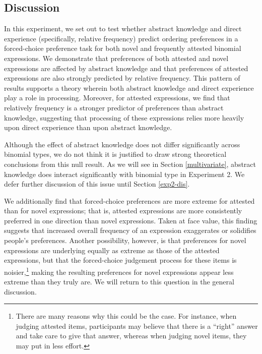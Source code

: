 \documentclass[authoryear]{elsarticle}
\begin{document}
\subsection{Discussion}\label{fc-discuss}
In this experiment, we set out to test whether abstract knowledge and direct experience (specifically, relative frequency) predict ordering preferences in a forced-choice preference task for both novel and frequently attested binomial expressions. We demonstrate that preferences of both attested and novel expressions are affected by abstract knowledge and that preferences of attested expressions are also strongly predicted by relative frequency. This pattern of results supports a theory wherein both abstract knowledge and direct experience play a role in processing. Moreover, for attested expressions, we find that relatively frequency is a stronger predictor of preferences than abstract knowledge, suggesting that processing of these expressions relies more heavily upon direct experience than upon abstract knowledge. 

Although the effect of abstract knowledge does not differ significantly across binomial types, we do not think it is justified to draw strong theoretical conclusions from this null result. As we will see in Section \ref{multivariate}, abstract knowledge does interact significantly with binomial type in Experiment 2. We defer further discussion of this issue until Section \ref{exp2-dis}.

We additionally find that forced-choice preferences are more extreme for attested than for novel expressions; that is, attested expressions are more consistently preferred in one direction than novel expressions. Taken at face value, this finding suggests that increased overall frequency of an expression exaggerates or solidifies people's preferences. Another possibility, however, is that preferences for novel expressions are underlying equally as extreme as those of the attested expressions, but that the forced-choice judgement process for these items is noisier,\footnote{There are many reasons why this could be the case. For instance, when judging attested items, participants may believe that there is a ``right'' answer and take care to give that answer, whereas when judging novel items, they may put in less effort.} making the resulting preferences for novel expressions appear less extreme than they truly are. We will return to this question in the general discussion.
\end{document}

